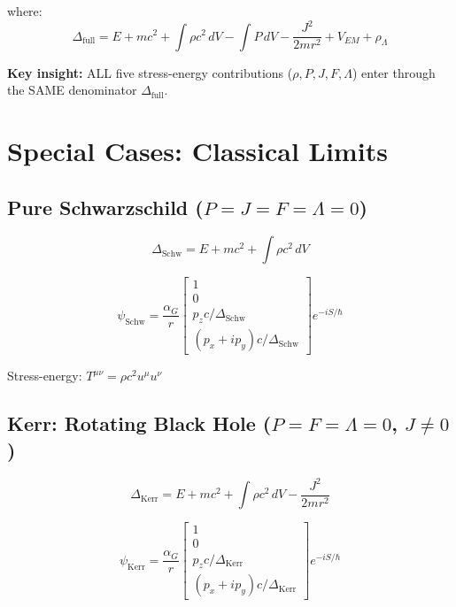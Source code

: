 \documentclass[11pt,a4paper]{article}
\theoremstyle{definition}
\theoremstyle{remark}
\begin{document}
	where:
	\begin{equation}
		\boxed{
			\Delta_{\mathrm{full}} = E + mc^2 + \int\rho c^2\,dV - \int P\,dV - \frac{J^2}{2mr^2} + V_{EM} + \rho_\Lambda
		}
		\label{eq:Delta_unified}
	\end{equation}
	
	\textbf{Key insight:} ALL five stress-energy contributions ($\rho,P,J,F,\Lambda$) enter through the SAME denominator $\Delta_{\mathrm{full}}$.
	
	\section{Special Cases: Classical Limits}
	
	\subsection{Pure Schwarzschild ($P=J=F=\Lambda=0$)}
	
	\begin{equation}
		\Delta_{\mathrm{Schw}} = E + mc^2 + \int\rho c^2\,dV
	\end{equation}
	
	\begin{equation}
		\psi_{\mathrm{Schw}} = \frac{\alpha_G}{r}\begin{bmatrix}1\\0\\ p_zc/\Delta_{\mathrm{Schw}}\\ (p_x+ip_y)c/\Delta_{\mathrm{Schw}}\end{bmatrix}e^{-iS/\hbar}
	\end{equation}
	
	Stress-energy: $T^{\mu\nu} = \rho c^2 u^\mu u^\nu$
	
	\subsection{Kerr: Rotating Black Hole ($P=F=\Lambda=0$, $J\neq0$)}
	
	\begin{equation}
		\Delta_{\mathrm{Kerr}} = E + mc^2 + \int\rho c^2\,dV - \frac{J^2}{2mr^2}
	\end{equation}
	
	\begin{equation}
		\psi_{\mathrm{Kerr}} = \frac{\alpha_G}{r}\begin{bmatrix}1\\0\\ p_zc/\Delta_{\mathrm{Kerr}}\\ (p_x+ip_y)c/\Delta_{\mathrm{Kerr}}\end{bmatrix}e^{-iS/\hbar}
	\end{equation}
	
\end{document}
